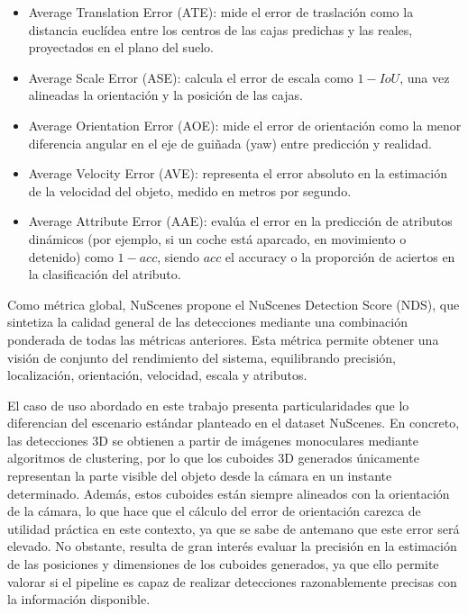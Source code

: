 \begin{itemize}
    \item Average Translation Error (ATE): mide el error de traslación como la distancia euclídea entre los centros de las cajas predichas y las reales, proyectados en el plano del suelo.
    
    \item Average Scale Error (ASE): calcula el error de escala como $1 - IoU$, una vez alineadas la orientación y la posición de las cajas.
    
    \item Average Orientation Error (AOE): mide el error de orientación como la menor diferencia angular en el eje de guiñada (yaw) entre predicción y realidad.
    
    \item Average Velocity Error (AVE): representa el error absoluto en la estimación de la velocidad del objeto, medido en metros por segundo.

    \item Average Attribute Error (AAE): evalúa el error en la predicción de atributos dinámicos (por ejemplo, si un coche está aparcado, en movimiento o detenido) como $1 - acc$, siendo $acc$ el accuracy o la proporción de aciertos en la clasificación del atributo.
\end{itemize}

Como métrica global, NuScenes propone el NuScenes Detection Score (NDS), que sintetiza la calidad general de las detecciones mediante una combinación ponderada de todas las métricas anteriores. Esta métrica permite obtener una visión de conjunto del rendimiento del sistema, equilibrando precisión, localización, orientación, velocidad, escala y atributos.

El caso de uso abordado en este trabajo presenta particularidades que lo diferencian del escenario estándar planteado en el dataset NuScenes. En concreto, las detecciones 3D se obtienen a partir de imágenes monoculares mediante algoritmos de clustering, por lo que los cuboides 3D generados únicamente representan la parte visible del objeto desde la cámara en un instante determinado. Además, estos cuboides están siempre alineados con la orientación de la cámara, lo que hace que el cálculo del error de orientación carezca de utilidad práctica en este contexto, ya que se sabe de antemano que este error será elevado. No obstante, resulta de gran interés evaluar la precisión en la estimación de las posiciones y dimensiones de los cuboides generados, ya que ello permite valorar si el pipeline es capaz de realizar detecciones razonablemente precisas con la información disponible.

